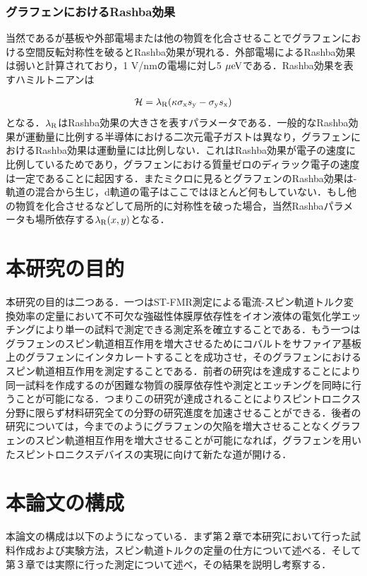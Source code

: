 \subsubsection{グラフェンにおけるRashba効果}
当然であるが基板や外部電場または他の物質を化合させることでグラフェンにおける空間反転対称性を破るとRashba効果が現れる．外部電場によるRashba効果は弱いと計算されており，1 V/nmの電場に対し5$\rm\ \mu eV$である．Rashba効果を表すハミルトニアンは

\begin{eqnarray}
\mathcal{H} = \lambda_{\rm R}(\kappa\sigma_{\rm x}s_{\rm y}-\sigma_{\rm y}s_{\rm x})
\label{eq:RashbaHamil_gra}
\end{eqnarray}
となる．$\lambda_{\rm R}$はRashba効果の大きさを表すパラメータである．一般的なRashba効果が運動量に比例する半導体における二次元電子ガストは異なり，グラフェンにおけるRashba効果は運動量には比例しない．これはRashba効果が電子の速度に比例しているためであり，グラフェンにおける質量ゼロのディラック電子の速度は一定であることに起因する．またミクロに見るとグラフェンのRashba効果は\pi-\sigma　軌道の混合から生じ，d軌道の電子はここではほとんど何もしていない．もし他の物質を化合させるなどして局所的に対称性を破った場合，当然Rashbaパラメータも場所依存する$\lambda_{\rm R}(x,y)$となる．

\section{本研究の目的}
本研究の目的は二つある．一つはST-FMR測定による電流-スピン軌道トルク変換効率の定量において不可欠な強磁性体膜厚依存性をイオン液体の電気化学エッチングにより単一の試料で測定できる測定系を確立することである．もう一つはグラフェンのスピン軌道相互作用を増大させるためにコバルトをサファイア基板上のグラフェンにインタカレートすることを成功させ，そのグラフェンにおけるスピン軌道相互作用を測定することである．前者の研究はを達成することにより同一試料を作成するのが困難な物質の膜厚依存性や測定とエッチングを同時に行うことが可能になる．つまりこの研究が達成されることによりスピントロニクス分野に限らず材料研究全ての分野の研究進度を加速させることができる．後者の研究については，今までのようにグラフェンの欠陥を増大させることなくグラフェンのスピン軌道相互作用を増大させることが可能になれば，グラフェンを用いたスピントロニクスデバイスの実現に向けて新たな道が開ける．



\section{本論文の構成}
本論文の構成は以下のようになっている．まず第２章で本研究において行った試料作成および実験方法，スピン軌道トルクの定量の仕方について述べる．そして第３章では実際に行った測定について述べ，その結果を説明し考察する．




